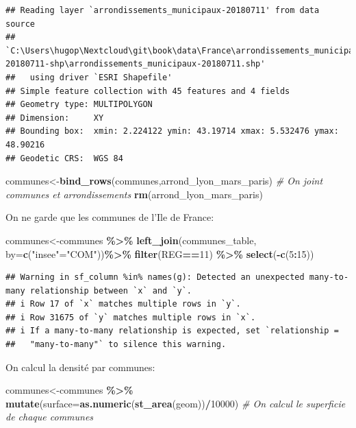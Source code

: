 \documentclass[
]{book}
\newenvironment{Shaded}{\begin{snugshade}}{\end{snugshade}}
\newcommand{\AttributeTok}[1]{\textcolor[rgb]{0.13,0.29,0.53}{#1}}
\newcommand{\CommentTok}[1]{\textcolor[rgb]{0.56,0.35,0.01}{\textit{#1}}}
\newcommand{\DecValTok}[1]{\textcolor[rgb]{0.00,0.00,0.81}{#1}}
\newcommand{\FunctionTok}[1]{\textcolor[rgb]{0.13,0.29,0.53}{\textbf{#1}}}
\newcommand{\NormalTok}[1]{#1}
\newcommand{\OtherTok}[1]{\textcolor[rgb]{0.56,0.35,0.01}{#1}}
\newcommand{\SpecialCharTok}[1]{\textcolor[rgb]{0.81,0.36,0.00}{\textbf{#1}}}
\newcommand{\StringTok}[1]{\textcolor[rgb]{0.31,0.60,0.02}{#1}}
\begin{document}
\begin{verbatim}
## Reading layer `arrondissements_municipaux-20180711' from data source 
##   `C:\Users\hugop\Nextcloud\git\book\data\France\arrondissements_municipaux-20180711-shp\arrondissements_municipaux-20180711.shp' 
##   using driver `ESRI Shapefile'
## Simple feature collection with 45 features and 4 fields
## Geometry type: MULTIPOLYGON
## Dimension:     XY
## Bounding box:  xmin: 2.224122 ymin: 43.19714 xmax: 5.532476 ymax: 48.90216
## Geodetic CRS:  WGS 84
\end{verbatim}

\begin{Shaded}
\begin{Highlighting}[]
\NormalTok{communes}\OtherTok{\textless{}{-}}\FunctionTok{bind\_rows}\NormalTok{(communes,arrond\_lyon\_mars\_paris) }\CommentTok{\# On joint communes et arrondissements}
\FunctionTok{rm}\NormalTok{(arrond\_lyon\_mars\_paris)}
\end{Highlighting}
\end{Shaded}

On ne garde que les communes de l'Ile de France:

\begin{Shaded}
\begin{Highlighting}[]
\NormalTok{communes}\OtherTok{\textless{}{-}}\NormalTok{communes }\SpecialCharTok{\%\textgreater{}\%}
  \FunctionTok{left\_join}\NormalTok{(communes\_table, }\AttributeTok{by=}\FunctionTok{c}\NormalTok{(}\StringTok{"insee"}\OtherTok{=}\StringTok{"COM"}\NormalTok{))}\SpecialCharTok{\%\textgreater{}\%}
  \FunctionTok{filter}\NormalTok{(REG}\SpecialCharTok{==}\DecValTok{11}\NormalTok{) }\SpecialCharTok{\%\textgreater{}\%}
  \FunctionTok{select}\NormalTok{(}\SpecialCharTok{{-}}\FunctionTok{c}\NormalTok{(}\DecValTok{5}\SpecialCharTok{:}\DecValTok{15}\NormalTok{))}
\end{Highlighting}
\end{Shaded}

\begin{verbatim}
## Warning in sf_column %in% names(g): Detected an unexpected many-to-many relationship between `x` and `y`.
## i Row 17 of `x` matches multiple rows in `y`.
## i Row 31675 of `y` matches multiple rows in `x`.
## i If a many-to-many relationship is expected, set `relationship =
##   "many-to-many"` to silence this warning.
\end{verbatim}

On calcul la densité par communes:

\begin{Shaded}
\begin{Highlighting}[]
\NormalTok{communes}\OtherTok{\textless{}{-}}\NormalTok{communes }\SpecialCharTok{\%\textgreater{}\%}
  \FunctionTok{mutate}\NormalTok{(}\AttributeTok{surface=}\FunctionTok{as.numeric}\NormalTok{(}\FunctionTok{st\_area}\NormalTok{(geom))}\SpecialCharTok{/}\DecValTok{10000}\NormalTok{) }\CommentTok{\# On calcul le superficie de chaque communes}
\end{Highlighting}
\end{Shaded}
\end{document}
